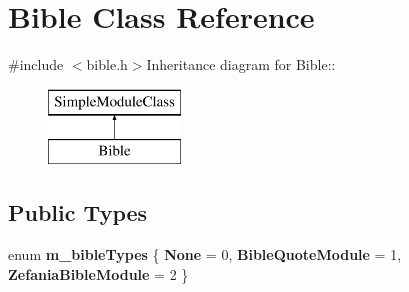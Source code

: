 \hypertarget{classBible}{
\section{Bible Class Reference}
\label{classBible}
}


{\ttfamily \#include $<$bible.h$>$}Inheritance diagram for Bible::\begin{figure}[H]
\begin{center}
\leavevmode
\includegraphics[height=2cm]{classBible}
\end{center}
\end{figure}
\subsection*{Public Types}
\begin{DoxyCompactItemize}
\item 
enum {\bfseries m\_\-bibleTypes} \{ {\bfseries None} =  0, 
{\bfseries BibleQuoteModule} =  1, 
{\bfseries ZefaniaBibleModule} =  2
 \}
\end{DoxyCompactItemize}
